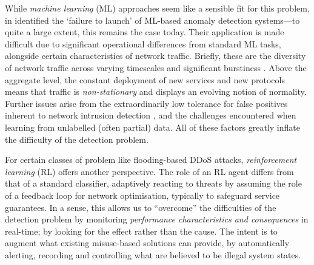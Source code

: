 \documentclass[conference, letterpaper, 10pt, times]{IEEEtran}
\begin{document}
While \emph{machine learning} (ML) approaches seem like a sensible fit for this problem, in \citeyear{DBLP:conf/sp/SommerP10} \textcite{DBLP:conf/sp/SommerP10} identified the `failure to launch' of ML-based anomaly detection systems---to quite a large extent, this remains the case today.
Their application is made difficult due to significant operational differences from standard ML tasks, alongside certain characteristics of network traffic.
Briefly, these are the diversity of network traffic across varying timescales \cite{DBLP:conf/sp/SommerP10} and significant burstiness \cite{DBLP:journals/ccr/LelandWTW95}.
Above the aggregate level, the constant deployment of new services and new protocols means that traffic is \emph{non-stationary} and displays an evolving notion of normality.
Further issues arise from the extraordinarily low tolerance for false positives inherent to network intrusion detection \cite{DBLP:conf/ccs/Axelsson99}, and the challenges encountered when learning from unlabelled (often partial) data.
All of these factors greatly inflate the difficulty of the detection problem.

For certain classes of problem like flooding-based DDoS attacks, \emph{reinforcement learning} (RL) offers another perspective.
The role of an RL agent differs from that of a standard classifier, adaptively reacting to threats by assuming the role of a feedback loop for network optimisation, typically to safeguard service guarantees.
In a sense, this allows us to ``overcome'' the difficulties of the detection problem by monitoring \emph{performance characteristics and consequences} in real-time; by looking for the effect rather than the cause.
The intent is to augment what existing misuse-based solutions can provide, by automatically alerting, recording and controlling what are believed to be illegal system states.
\end{document}
